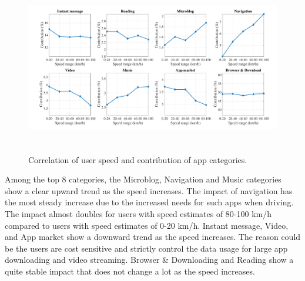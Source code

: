 
\begin{figure}[ht]
    \centering
    \includegraphics[width=\linewidth,height=3in]{./figures/large_font/speed_appcat.pdf}
    \vspace{-0.3in}
    \caption{Correlation of user speed and contribution of app categories.}
    \label{fig:speed_appcat}
\end{figure}

Among the top 8 categories, the Microblog, Navigation and Music categories show a clear upward trend as the speed increases.
The impact of navigation has the most steady increase due to the increased needs for such apps when driving.
The impact almost doubles for users with speed estimates of 80-100 km/h compared to users with speed estimates of 0-20 km/h.
Instant message, Video, and App market show a downward trend as the speed increases.
The reason could be the users are cost sensitive and strictly control the data usage for large app downloading and video streaming.
Browser \& Downloading and Reading show a quite stable impact that does not change a lot as the speed increases.







